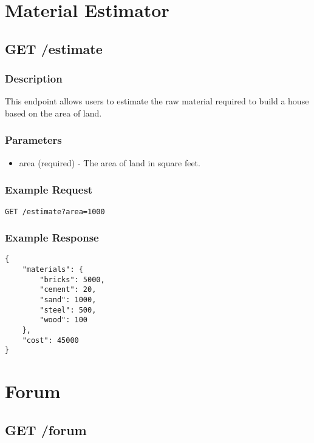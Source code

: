 \documentclass{article}
\begin{document}
\section{Material Estimator}

\subsection{GET /estimate}

\subsubsection{Description}

This endpoint allows users to estimate the raw material required to build a house based on the area of land.

\subsubsection{Parameters}

\begin{itemize}
  \item area (required) - The area of land in square feet.
\end{itemize}

\subsubsection{Example Request}

\begin{verbatim}
GET /estimate?area=1000
\end{verbatim}

\subsubsection{Example Response}

\begin{verbatim}
{
    "materials": {
        "bricks": 5000,
        "cement": 20,
        "sand": 1000,
        "steel": 500,
        "wood": 100
    },
    "cost": 45000
}
\end{verbatim}

\section{Forum}

\subsection{GET /forum}
\end{document}
